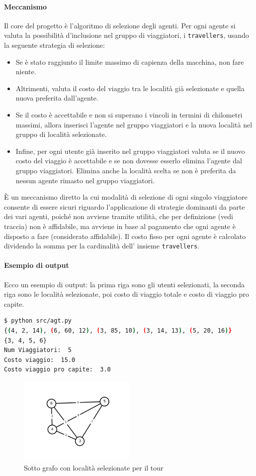 \documentclass{article}
\begin{document}
\paragraph*{Meccanismo}
Il core del progetto è l'algoritmo di selezione degli agenti. Per ogni agente si valuta la possibilità d'inclusione nel gruppo di viaggiatori, i \verb|travellers|, usando la seguente strategia di selezione:
\begin{itemize}
  \item Se è stato raggiunto il limite massimo di capienza della macchina, non fare niente.
  \item Altrimenti, valuta il costo del viaggio tra le località già selezionate e quella nuova preferita dall'agente.
  \item Se il costo è accettabile e non si superano i vincoli in termini di chilometri massimi, allora inserisci l'agente nel gruppo viaggiatori e la nuova località nel gruppo di località selezionate.
  \item Infine, per ogni utente già inserito nel gruppo viaggiatori valuta se il nuovo costo del viaggio è accettabile e se non dovesse esserlo elimina l'agente dal gruppo viaggiatori. Elimina anche la località scelta se non è preferita da nessun agente rimasto nel gruppo viaggiatori.
\end{itemize}
È un meccanismo diretto la cui modalità di selezione di ogni singolo viaggiatore consente di essere sicuri riguardo l'applicazione di strategie dominanti da parte dei vari agenti, poiché non avviene tramite utilità, che per definizione (vedi traccia) non è affidabile, ma avviene in base al pagamento che ogni agente è disposto a fare (considerato affidabile).
Il costo fisso per ogni agente è calcolato dividendo la somma per la cardinalità dell' insieme \verb|travellers|.
\paragraph*{Esempio di output}
Ecco un esempio di output: la prima riga sono gli utenti selezionati, la seconda riga sono le località selezionate, poi costo di viaggio totale e costo di viaggio pro capite.
\begin{lstlisting}[language=bash]
$ python src/agt.py
{(4, 2, 14), (6, 60, 12), (3, 85, 10), (3, 14, 13), (5, 20, 16)}
{3, 4, 5, 6}
Num Viaggiatori:  5
Costo viaggio:  15.0
Costo viaggio pro capite:  3.0
\end{lstlisting}

\begin{figure}[h]
  \centering
  \includegraphics[width=0.50\textwidth]{img/graphOutput.png}
  \caption{Sotto grafo con località selezionate per il tour}\label{fig:graphOutput.png}
\end{figure}
\clearpage
\pagebreak
\end{document}
